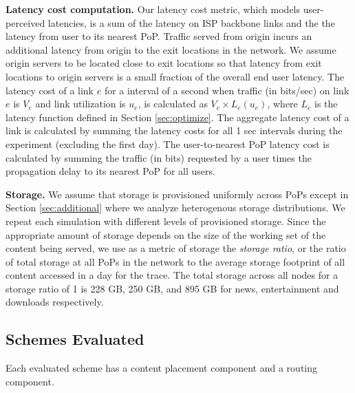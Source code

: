 {\bf Latency cost computation.}  Our latency cost metric, which models user-perceived latencies, is a sum of the latency on ISP backbone links and the the latency from user to its nearest PoP.  Traffic served from origin  incurs an additional latency from origin to the exit locations in the network. We assume origin servers to be located close to exit locations so that latency from exit locations  to origin servers is a small fraction of the overall end user latency.
The latency cost of a link $e$ for a interval of a second when traffic (in bits/sec) on link $e$ is $V_e$ and link utilization is $u_e$, is calculated as $V_e \times L_e(u_e)$, where $L_e$ is the latency function defined in Section \ref{sec:optimize}. 
The aggregate latency cost of a link is calculated by summing the latency costs for all 1 sec intervals during the experiment (excluding the first day).
The user-to-nearest PoP latency cost is calculated by summing the traffic (in bits) requested by a user times the propagation delay to its nearest PoP for all users.


{\bf Storage.} We assume that storage is provisioned uniformly across PoPs except in Section \ref{sec:additional} where we analyze heterogenous storage distributions. We repeat each simulation with different levels of provisioned storage. Since the appropriate amount of storage depends on the size of the working set of the content being served, we use as a metric of storage the {\em storage ratio},  or  the ratio of total storage at all PoPs in the network to the average storage footprint of all content accessed in a day for the trace. 
The total storage across all nodes for a storage ratio of 1 is 228 GB, 250 GB, and 895 GB for news, entertainment and downloads respectively.





\subsection{Schemes Evaluated}
Each evaluated scheme has a content placement component and a routing component. 


